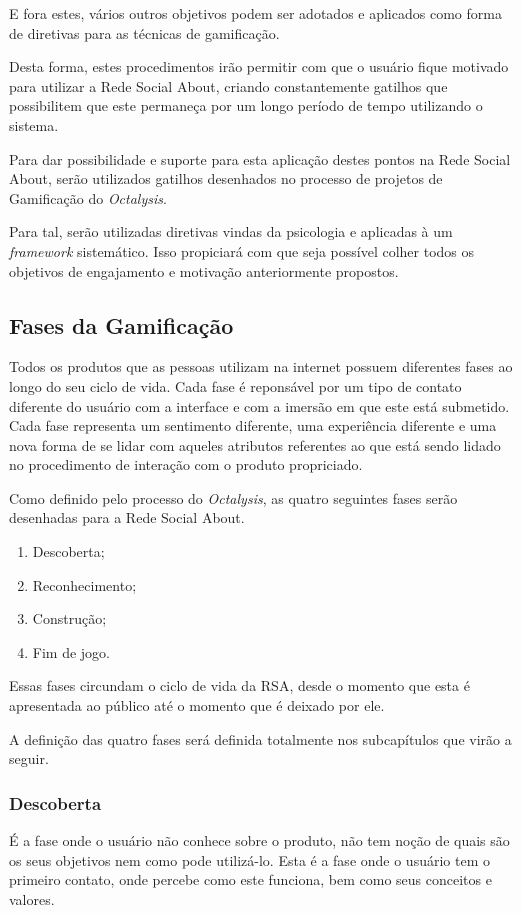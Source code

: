 E fora
estes, vários outros  objetivos podem ser adotados e aplicados como forma
de diretivas para as técnicas de gamificação.

Desta forma, estes procedimentos irão permitir com que o usuário fique motivado
para utilizar a Rede Social About, criando constantemente gatilhos que possibilitem
que este permaneça por um longo período de tempo utilizando o sistema.

Para dar possibilidade e suporte para esta aplicação destes pontos na Rede
Social About, serão utilizados gatilhos desenhados no processo de projetos
de Gamificação do \textit{Octalysis}.

Para tal, serão utilizadas diretivas vindas da psicologia e aplicadas à um
\textit{framework} sistemático. Isso propiciará com que seja possível colher
todos os objetivos de engajamento e motivação anteriormente propostos.

\subsection{Fases da Gamificação}
\label{sub:fasesgamifição}
Todos os produtos que as pessoas utilizam na internet possuem diferentes
fases ao longo do seu ciclo de vida. Cada fase é reponsável por um tipo de contato diferente 
do usuário com a interface e com a imersão em que este está submetido.
Cada fase representa um sentimento diferente, uma experiência diferente
e uma nova forma de se lidar com aqueles atributos referentes ao que está
sendo lidado no procedimento de interação com o produto propriciado.

Como definido pelo processo do \textit{Octalysis}, as quatro seguintes fases serão
desenhadas para a Rede Social About.

\begin{enumerate}
    \item Descoberta;
    \item Reconhecimento;
    \item Construção;
    \item Fim de jogo.
\end{enumerate}

Essas fases circundam o ciclo de vida da RSA, desde o momento que esta
é apresentada ao público até o momento que é deixado por ele. 

A definição das quatro fases será definida totalmente nos subcapítulos que virão  a seguir.

\subsubsection{Descoberta}
\label{sub:descoperta}
É a fase onde o usuário não conhece sobre o produto, não tem noção de quais são os
seus objetivos nem como pode utilizá-lo. Esta é a fase onde o usuário tem o primeiro
contato, onde percebe como este funciona, bem como seus conceitos e valores.

